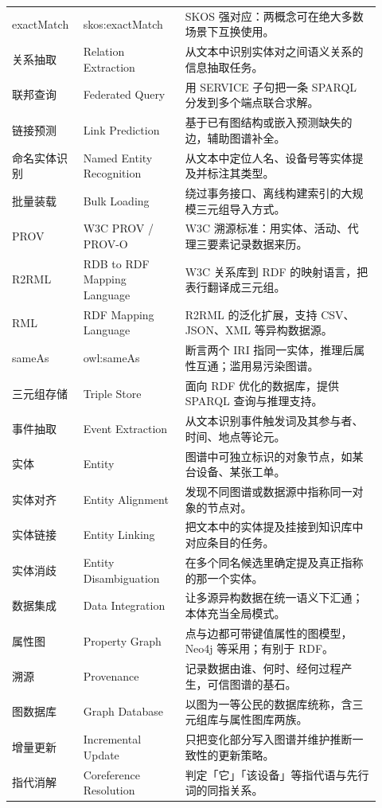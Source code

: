 \begin{longtable}{@{}p{0.16\linewidth}p{0.26\linewidth}p{0.5\linewidth}@{}}
exactMatch & skos:exactMatch & SKOS 强对应：两概念可在绝大多数场景下互换使用。 \\
关系抽取 & Relation Extraction & 从文本中识别实体对之间语义关系的信息抽取任务。 \\
联邦查询 & Federated Query & 用 SERVICE 子句把一条 SPARQL 分发到多个端点联合求解。 \\
链接预测 & Link Prediction & 基于已有图结构或嵌入预测缺失的边，辅助图谱补全。 \\
命名实体识别 & Named Entity Recognition & 从文本中定位人名、设备号等实体提及并标注其类型。 \\
批量装载 & Bulk Loading & 绕过事务接口、离线构建索引的大规模三元组导入方式。 \\
PROV & W3C PROV / PROV-O & W3C 溯源标准：用实体、活动、代理三要素记录数据来历。 \\
R2RML & RDB to RDF Mapping Language & W3C 关系库到 RDF 的映射语言，把表行翻译成三元组。 \\
RML & RDF Mapping Language & R2RML 的泛化扩展，支持 CSV、JSON、XML 等异构数据源。 \\
sameAs & owl:sameAs & 断言两个 IRI 指同一实体，推理后属性互通；滥用易污染图谱。 \\
三元组存储 & Triple Store & 面向 RDF 优化的数据库，提供 SPARQL 查询与推理支持。 \\
事件抽取 & Event Extraction & 从文本识别事件触发词及其参与者、时间、地点等论元。 \\
实体 & Entity & 图谱中可独立标识的对象节点，如某台设备、某张工单。 \\
实体对齐 & Entity Alignment & 发现不同图谱或数据源中指称同一对象的节点对。 \\
实体链接 & Entity Linking & 把文本中的实体提及挂接到知识库中对应条目的任务。 \\
实体消歧 & Entity Disambiguation & 在多个同名候选里确定提及真正指称的那一个实体。 \\
数据集成 & Data Integration & 让多源异构数据在统一语义下汇通；本体充当全局模式。 \\
属性图 & Property Graph & 点与边都可带键值属性的图模型，Neo4j 等采用；有别于 RDF。 \\
溯源 & Provenance & 记录数据由谁、何时、经何过程产生，可信图谱的基石。 \\
图数据库 & Graph Database & 以图为一等公民的数据库统称，含三元组库与属性图库两族。 \\
增量更新 & Incremental Update & 只把变化部分写入图谱并维护推断一致性的更新策略。 \\
指代消解 & Coreference Resolution & 判定「它」「该设备」等指代语与先行词的同指关系。 \\

\end{longtable}
